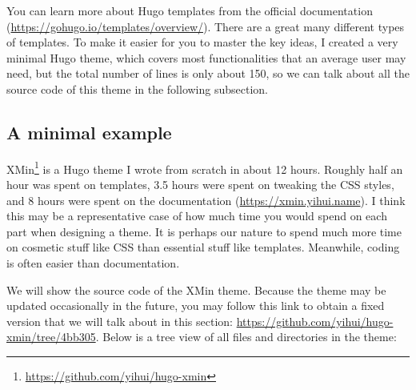 \documentclass[12pt,]{krantz}
\renewcommand{\href}[2]{#2\footnote{\url{#1}}}
\theoremstyle{definition}
\theoremstyle{definition}
\theoremstyle{definition}
\theoremstyle{remark}
\begin{document}
You can learn more about Hugo templates from the official documentation
(\url{https://gohugo.io/templates/overview/}). There are a great many
different types of templates. To make it easier for you to master the
key ideas, I created a very minimal Hugo theme, which covers most
functionalities that an average user may need, but the total number of
lines is only about 150, so we can talk about all the source code of
this theme in the following subsection.

\hypertarget{a-minimal-example}{%
\subsection{A minimal example}\label{a-minimal-example}}

\href{https://github.com/yihui/hugo-xmin}{XMin} is a Hugo
theme I wrote from scratch in about 12 hours. Roughly
half an hour was spent on templates, 3.5 hours were spent on tweaking
the CSS styles, and 8 hours were spent on the documentation
(\url{https://xmin.yihui.name}). I think this may be a representative
case of how much time you would spend on each part when designing a
theme. It is perhaps our nature to spend much more time on cosmetic
stuff like CSS than essential stuff like templates. Meanwhile, coding is
often easier than documentation.

We will show the source code of the XMin theme. Because the theme may be
updated occasionally in the future, you may follow this link to obtain a
fixed version that we will talk about in this section:
\url{https://github.com/yihui/hugo-xmin/tree/4bb305}. Below is a tree
view of all files and directories in the theme:
\end{document}
